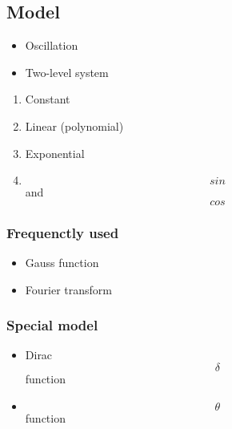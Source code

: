 \subsection{Model}

\begin{itemize}
    \item Oscillation
    \item Two-level system
\end{itemize}

\begin{enumerate}
    \item Constant
    \item Linear (polynomial)
    \item Exponential
    \item $$sin$$ and $$cos$$
\end{enumerate}

\subsubsection{Frequenctly used}
\begin{itemize}
    \item Gauss function
    \item Fourier transform
\end{itemize}

\subsubsection{Special model}
\begin{itemize}
    \item Dirac $$\delta$$ function
    \item $$\theta$$ function
\end{itemize}
